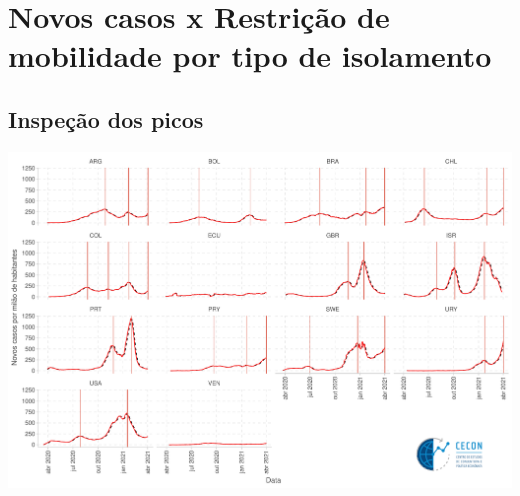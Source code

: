 \documentclass{SelfArx}
\begin{document}
\section*{Novos casos x Restrição de mobilidade por tipo de isolamento}
\label{sec:orgaaf31f1}
\subsection*{Inspeção dos picos}
\label{sec:org974d230}

\begin{center}
\includegraphics[width=.9\linewidth]{./figs/COVID/Picos.pdf}
\end{center}
\end{document}
